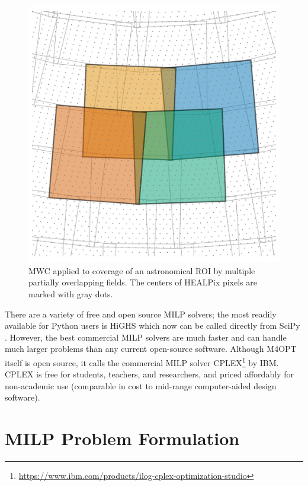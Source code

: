 \documentclass[twocolumn,times]{aastex631}
\begin{document}
\begin{figure}
    \includegraphics[width=\columnwidth]{figures/overlapping-fields}
    \caption{\label{fig:overlapping-fields}\ac{MWC} applied to coverage of an astronomical \ac{ROI} by multiple partially overlapping fields. The centers of \ac{HEALPix} pixels are marked with gray dots.}
\end{figure}

There are a variety of free and open source \ac{MILP} solvers; the most readily available for Python users is HiGHS \citep{huangfu2018parallelizing} which now can be called directly from SciPy \citep{2020NatMe..17..261V}. However, the best commercial \ac{MILP} solvers are much faster and can handle much larger problems than any current open-source software. Although \ac{M4OPT} itself is open source, it calls the commercial \ac{MILP} solver CPLEX\footnote{\url{https://www.ibm.com/products/ilog-cplex-optimization-studio}} by IBM. CPLEX is free for students, teachers, and researchers, and priced affordably for non-academic use (comparable in cost to mid-range computer-aided design software).

\section{\ac{MILP} Problem Formulation}
\end{document}
